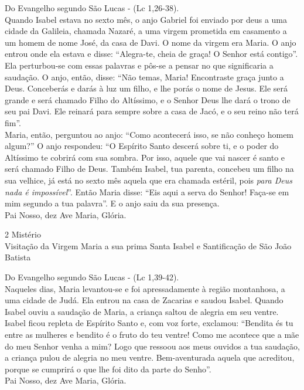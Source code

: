 \documentclass{book}
\begin{document}
\begin{flushleft}
    Do Evangelho segundo São Lucas - (\textcolor{VioletRed2}{Lc 1,26-38}). \\
    \hfill{} \break{}
    Quando Isabel estava no sexto mês, o anjo Gabriel foi enviado por deus a uma cidade da Galileia, chamada Nazaré, a uma virgem prometida em casamento a um homem de nome José, da casa de Davi. O nome da virgem era Maria. O anjo entrou onde ela estava e disse: ``Alegra-te, cheia de graça! O Senhor está contigo''. Ela perturbou-se com essas palavras e pôs-se a pensar no que significaria a saudação. O anjo, então, disse: ``Não temas, Maria! Encontraste graça junto a Deus. Conceberás e darás à luz um filho, e lhe porás o nome de Jesus. Ele será grande e será chamado Filho do Altíssimo, e o Senhor Deus lhe dará o trono de seu pai Davi. Ele reinará para sempre sobre a casa de Jacó, e o seu reino não terá fim''.
    \vspace{.2cm} \\
    Maria, então, perguntou ao anjo: ``Como acontecerá isso, se não conheço homem algum?'' O anjo respondeu: ``O Espírito Santo descerá sobre ti, e o poder do Altíssimo te cobrirá com sua sombra. Por isso, aquele que vai nascer é santo e será chamado Filho de Deus. Também Isabel, tua parenta, concebeu um filho na sua velhice, já está no sexto mês aquela que era chamada estéril, pois \textit{para Deus nada é impossível}''. Então Maria disse: ``Eis aqui a serva do Senhor! Faça-se em mim segundo a tua palavra''. E o anjo saiu da sua presença. \\
    \hfill{} \break{}
    Pai Nosso, dez Ave Maria, Glória.
\end{flushleft}
\newpage
\begin{center}
    2\textordmasculine{} Mistério \\ Visitação da Virgem Maria a sua prima Santa Isabel e Santificação de São João Batista
\end{center}
\begin{flushleft}
    Do Evangelho segundo São Lucas - (\textcolor{VioletRed2}{Lc 1,39-42}). \\
    \hfill{} \break{}
    Naqueles dias, Maria levantou-se e foi apressadamente à região montanhosa, a uma cidade de Judá. Ela entrou na casa de Zacarias e saudou Isabel. Quando Isabel ouviu a saudação de Maria, a criança saltou de alegria em seu ventre. Isabel ficou repleta de Espírito Santo e, com voz forte, exclamou: ``Bendita és tu entre as mulheres e bendito é o fruto do teu ventre! Como me acontece que a mãe do meu Senhor venha a mim? Logo que ressoou aos meus ouvidos a tua saudação, a criança pulou de alegria no meu ventre. Bem-aventurada aquela que acreditou, porque se cumprirá o que lhe foi dito da parte do Senho''. \\
    \hfill{} \break{}
    Pai Nosso, dez Ave Maria, Glória.
\end{flushleft}
\end{document}
